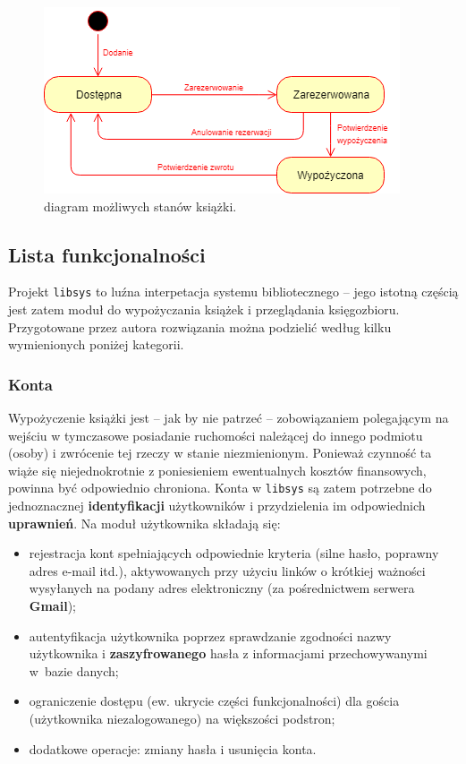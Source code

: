 \documentclass[12pt, a4paper]{article}
\begin{document}
\begin{figure}[h]
    \centering
    \includegraphics[width=\textwidth]{img/diagram_states.png}
    \caption{diagram możliwych stanów książki.}
    \label{fig:stdiagram}
\end{figure}

\subsection{Lista funkcjonalności}
\label{libsys_func}
Projekt \texttt{libsys} to luźna interpetacja systemu bibliotecznego -- jego istotną częścią jest zatem moduł do wypożyczania książek i przeglądania księgozbioru. Przygotowane przez autora rozwiązania można podzielić według kilku wymienionych poniżej kategorii.

\subsubsection{Konta}
Wypożyczenie książki jest -- jak by nie patrzeć -- zobowiązaniem polegającym na wejściu w tymczasowe posiadanie ruchomości należącej do innego podmiotu (osoby) i zwrócenie tej rzeczy w stanie niezmienionym. Ponieważ czynność ta wiąże się niejednokrotnie z poniesieniem ewentualnych kosztów finansowych, powinna być odpowiednio chroniona. Konta w \texttt{libsys} są zatem potrzebne do jednoznacznej \textbf{identyfikacji} użytkowników i przydzielenia im odpowiednich \textbf{uprawnień}. Na moduł użytkownika składają się:
\begin{itemize}
    \item rejestracja kont spełniających odpowiednie kryteria (silne hasło, poprawny adres e-mail itd.), aktywowanych przy użyciu linków o krótkiej ważności wysyłanych na podany adres elektroniczny (za pośrednictwem serwera \textbf{Gmail});
    \item autentyfikacja użytkownika poprzez sprawdzanie zgodności nazwy użytkownika i \textbf{zaszyfrowanego} hasła z informacjami przechowywanymi w~bazie danych;
    \item ograniczenie dostępu (ew. ukrycie części funkcjonalności) dla gościa (użytkownika niezalogowanego) na większości podstron;
    \item dodatkowe operacje: zmiany hasła i usunięcia konta.
\end{itemize}
\end{document}

